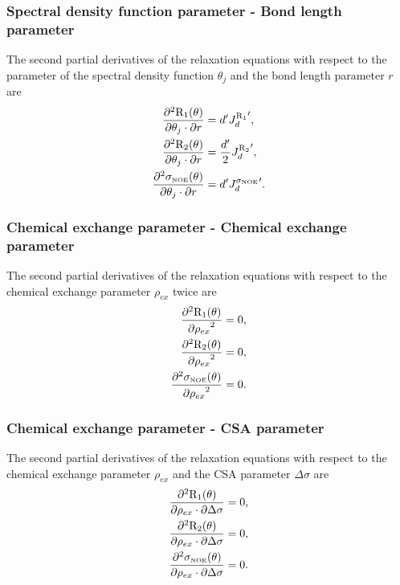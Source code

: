 \subsubsection{Spectral density function parameter - Bond length parameter}

The second partial derivatives of the relaxation equations with respect to the parameter of the spectral density function $\theta_j$ and the bond length parameter $r$ are
\begin{align}
    \frac{\partial^2 \mathrm{R}_1(\theta)}{\partial \theta_j \cdot \partial r} &= d' {J_d^{\mathrm{R}_1}}',               \label{eq: Ri': d2R1/dmfj.dr} \\
    \frac{\partial^2 \mathrm{R}_2(\theta)}{\partial \theta_j \cdot \partial r} &= \frac{d'}{2} {J_d^{\mathrm{R}_2}}',     \label{eq: Ri': d2R2/dmfj.dr} \\
    \frac{\partial^2 \sigma_{\scriptscriptstyle \mathrm{NOE}}(\theta)}{\partial \theta_j \cdot \partial r} &= d' {J_d^{\sigma_{\scriptscriptstyle \mathrm{NOE}}}}'. \label{eq: Ri': d2sigmaNOE/dmfj.dr}
\end{align}


\subsubsection{Chemical exchange parameter - Chemical exchange parameter}

The second partial derivatives of the relaxation equations with respect to the chemical exchange parameter $\rho_{ex}$ twice are
\begin{align}
    \frac{\partial^2 \mathrm{R}_1(\theta)}{{\partial \rho_{ex}}^2} &= 0,        \label{eq: Ri': d2R1/dRex2} \\
    \frac{\partial^2 \mathrm{R}_2(\theta)}{{\partial \rho_{ex}}^2} &= 0,        \label{eq: Ri': d2R2/dRex2} \\
    \frac{\partial^2 \sigma_{\scriptscriptstyle \mathrm{NOE}}(\theta)}{{\partial \rho_{ex}}^2} &= 0. \label{eq: Ri': d2sigmaNOE/dRex2}
\end{align}


\subsubsection{Chemical exchange parameter - CSA parameter}

The second partial derivatives of the relaxation equations with respect to the chemical exchange parameter $\rho_{ex}$ and the CSA parameter $\Delta\sigma$ are
\begin{align}
    \frac{\partial^2 \mathrm{R}_1(\theta)}{\partial \rho_{ex} \cdot \partial \Delta\sigma} &= 0,        \label{eq: Ri': d2R1/dRex.dCSA} \\
    \frac{\partial^2 \mathrm{R}_2(\theta)}{\partial \rho_{ex} \cdot \partial \Delta\sigma} &= 0,        \label{eq: Ri': d2R2/dRex.dCSA} \\
    \frac{\partial^2 \sigma_{\scriptscriptstyle \mathrm{NOE}}(\theta)}{\partial \rho_{ex} \cdot \partial \Delta\sigma} &= 0. \label{eq: Ri': d2sigmaNOE/dRex.dCSA}
\end{align}


